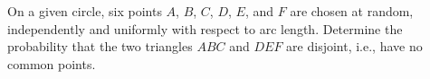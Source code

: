 On a given circle, six points $A$,  $B$,  $C$,  $D$,  $E$,  and $F$ are chosen at random, independently and uniformly with respect to arc length. Determine the probability that the two triangles $ABC$ and $DEF$ are disjoint, i.e., have no common points.